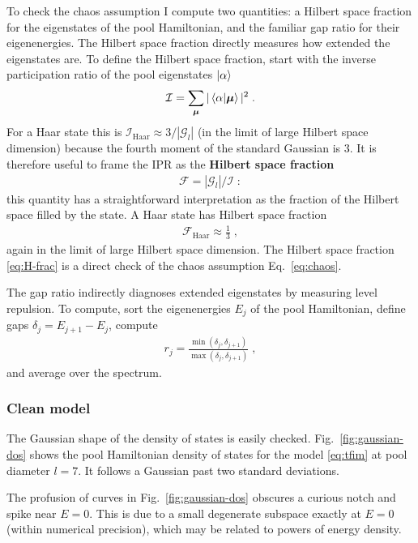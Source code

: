 \documentclass[aps,prb,nofootinbib,twocolumn,balancelastpage,amsmath,amssymb,floatfix,superscriptaddress,]{revtex4-1}
\newcommand{\pool}{\mathcal G}
\newcommand{\Haar}{\text{Haar}}
\begin{document}
{  To check the chaos assumption I compute two quantities:
  a Hilbert space fraction for the eigenstates of the pool Hamiltonian,
  and the familiar gap ratio for their eigenenergies.
  The Hilbert space fraction directly measures how extended the eigenstates are.
  To define the Hilbert space fraction, start with the inverse participation ratio of the pool eigenstates $\ket{\alpha}$
  \begin{align}
    \mathcal I = \sum_{\bm \mu} |\braket{\alpha|\bm \mu}|^2\;.
  \end{align}
  For a Haar state this is $ \mathcal I_{\Haar} \approx 3/|\pool_l| $
  (in the limit of large Hilbert space dimension)
  because the fourth moment of the standard Gaussian is $3$.
  It is therefore useful to frame the IPR as the \textbf{Hilbert space fraction}
  \begin{align}
    \label{eq:H-frac}
    \mathcal F = |\pool_l| / \mathcal I\;:
  \end{align}
  this quantity has a straightforward interpretation as the fraction of the Hilbert space filled by the state.
  A Haar state has Hilbert space fraction
  \begin{align}
    \mathcal F_\Haar \approx \frac 1 3\;,
  \end{align}
  again in the limit of large Hilbert space dimension.
  The Hilbert space fraction \eqref{eq:H-frac} is a direct check of the chaos assumption Eq.~\eqref{eq:chaos}.

  The gap ratio indirectly diagnoses extended eigenstates by measuring level repulsion.
  To compute, sort the eigenenergies $E_j$ of the pool Hamiltonian, define gaps $\delta_j = E_{j+1} - E_j$, compute
  \begin{align}
   r_j = \frac{\min(\delta_j, \delta_{j+1})}{\max(\delta_j,\delta_{j+1})}\;,
  \end{align}
  and average over the spectrum.

  \subsubsection{Clean model}
  
  The Gaussian shape of the density of states is easily checked.
  Fig.~\ref{fig:gaussian-dos} shows the pool Hamiltonian density of states for the model \eqref{eq:tfim} at pool diameter $l = 7$.
  It follows a Gaussian past two standard deviations.
  
  The profusion of curves in Fig.~\ref{fig:gaussian-dos} obscures a curious notch and spike near $E = 0$.
  This is due to a small degenerate subspace exactly at $E = 0$ (within numerical precision),
  which may be related to powers of energy density.


}
\end{document}
